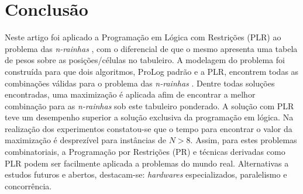 \documentclass[12pt]{article}
\newcommand{\nrainhas}{\emph{n-rainhas }}
\theoremstyle{definition}
\begin{document}
\section{Conclusão}
\label{sec:conclusao}

Neste artigo foi aplicado a Programação em Lógica com Restrições (PLR) ao problema das \nrainhas ,
com o diferencial de que o mesmo apresenta uma tabela de pesos sobre as posições/células no tabuleiro. 
A  modelagem do problema foi construída para que dois algoritmos, ProLog padrão e a PLR, encontrem todas as combinações válidas para o problema das \nrainhas. Dentre todas soluções encontradas, uma maximização é aplicada
afim de encontrar a melhor combinação para as \nrainhas sob este tabuleiro ponderado.
A solução com PLR  teve um desempenho superior a solução exclusiva da programação em lógica. Na realização dos experimentos constatou-se que o tempo para encontrar o valor da maximização é desprezível para instâncias de $N>8$. Assim, para estes problemas combinatoriais, a Programação por Restrições (PR) e técnicas derivadas como PLR podem ser facilmente aplicada a problemas do mundo real. Alternativas a estudos futuros e abertos, destacam-se: {\em hardwares} especializados, paralelismo e concorrência.





\end{document}
